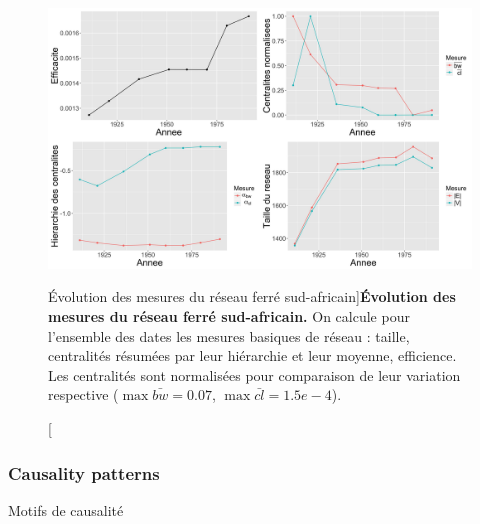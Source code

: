 \begin{figure}[h!]
\includegraphics[width=\linewidth]{Figures/Final/4-2-3-fig-causalityregimes-network.jpg}
\caption[Evolution of network measures][Évolution des mesures du réseau ferré sud-africain]{\label{fig:causalityregimes:network}}{\textbf{Évolution des mesures du réseau ferré sud-africain.} On calcule pour l'ensemble des dates les mesures basiques de réseau : taille, centralités résumées par leur hiérarchie et leur moyenne, efficience. Les centralités sont normalisées pour comparaison de leur variation respective ($\max \bar{bw} = 0.07$, $\max \bar{cl} = 1.5e-4$).\label{fig:causalityregimes:network}}
\end{figure}



\subsubsection{Causality patterns}{Motifs de causalité}


